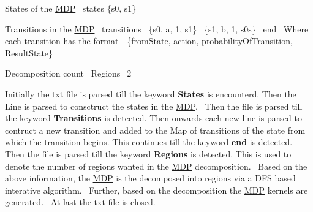 \begin{DoxyEnumerate}
\item States of the \hyperlink{classmdp_1_1core_1_1_m_d_p}{M\+D\+P}~\newline
 states \{s0, s1\}~\newline

\item Transitions in the \hyperlink{classmdp_1_1core_1_1_m_d_p}{M\+D\+P}~\newline
 transitions~\newline
 \{s0, a, 1, s1\}~\newline
 \{s1, b, 1, s0s\}~\newline
 end~\newline
 Where each transition has the format -\/ \{from\+State, action, probability\+Of\+Transition, Result\+State\}~\newline

\item Decomposition count~\newline
 Regions=2~\newline
 ~\newline

\end{DoxyEnumerate}

Initially the txt file is parsed till the keyword {\bfseries States} is encounterd. Then the Line is parsed to consctruct the states in the \hyperlink{classmdp_1_1core_1_1_m_d_p}{M\+D\+P}.~\newline
 Then the file is parsed till the keyword {\bfseries Transitions} is detected. Then onwards each new line is parsed to contruct a new transition and added to the Map of transitions of the state from which the transition begins. This continues till the keyword {\bfseries end} is detected.~\newline
 Then the file is parsed till the keyword {\bfseries Regions} is detected. This is used to denote the number of regions wanted in the \hyperlink{classmdp_1_1core_1_1_m_d_p}{M\+D\+P} decomposition.~\newline
 Based on the above information, the \hyperlink{classmdp_1_1core_1_1_m_d_p}{M\+D\+P} is the decomposed into regions via a D\+F\+S based interative algorithm.~\newline
 Further, based on the decomposition the \hyperlink{classmdp_1_1core_1_1_m_d_p}{M\+D\+P} kernels are generated.~\newline
 At last the txt file is closed.~\newline
 

